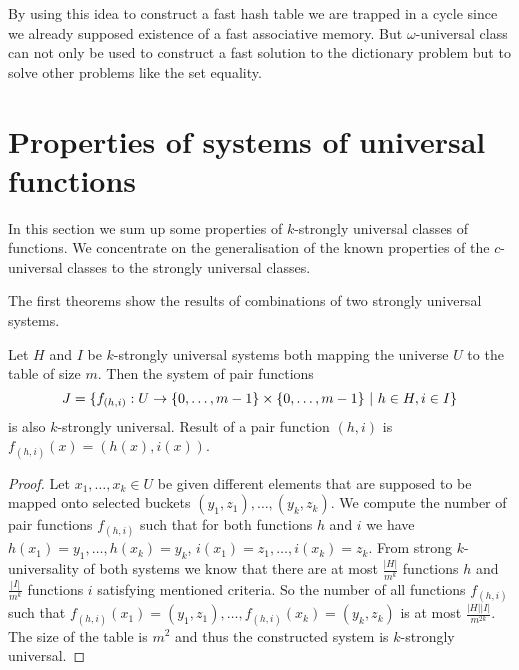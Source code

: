 By using this idea to construct a fast hash table we are trapped in a cycle since we already supposed existence of a fast associative memory. But $\omega$-universal class can not only be used to construct a fast solution to the dictionary problem but to solve other problems like the set equality. %



\section{Properties of systems of universal functions}
In this section we sum up some properties of $k$-strongly universal classes of functions. We concentrate on the generalisation of the known properties of the $c$-universal classes to the strongly universal classes.

The first theorems show the results of combinations of two strongly universal systems.
\begin{theorem}
Let $H$ and $I$ be $k$-strongly universal systems both mapping the universe $U$ to the table of size $m$. Then the system of pair functions 
\begin{displaymath}
J = \lbrace f_{(h, i)}: U \rightarrow \lbrace 0, \dots, m - 1 \rbrace \times \lbrace 0, \dots, m - 1 \rbrace \ | \  h \in H, i \in I \rbrace
\end{displaymath} 
is also $k$-strongly universal. Result of a pair function $(h, i)$ is $f_{(h, i)}(x) = (h(x), i(x))$.
\end{theorem}
\begin{proof}
Let $x_1, \dots, x_k \in U$ be given different elements that are supposed to be mapped onto selected buckets $(y_1, z_1), \dots, (y_k, z_k)$. We compute the number of pair functions $f_{(h, i)}$ such that for both functions $h$ and $i$ we have $h(x_1) = y_1, \dots, h(x_k) = y_k$, $i(x_1) = z_1, \dots, i(x_k) = z_k$. From strong $k$-universality of both systems we know that there are at most $\frac{|H|}{m^k}$ functions $h$ and $\frac{|I|}{m^k}$ functions $i$ satisfying mentioned criteria. So the number of all functions $f_{(h, i)}$ such that $f_{(h, i)}(x_1) = (y_1, z_1), \dots, f_{(h, i)}(x_k) = (y_k, z_k)$ is at most $\frac{|H||I|}{m^{2k}}$. The size of the table is $m^2$ and thus the constructed system is $k$-strongly universal.
\end{proof}

